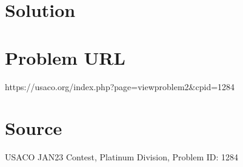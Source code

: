 \documentclass[12pt]{article}
\begin{document}
\section*{Solution}


\section*{Problem URL}
https://usaco.org/index.php?page=viewproblem2&cpid=1284

\section*{Source}
USACO JAN23 Contest, Platinum Division, Problem ID: 1284
\end{document}
